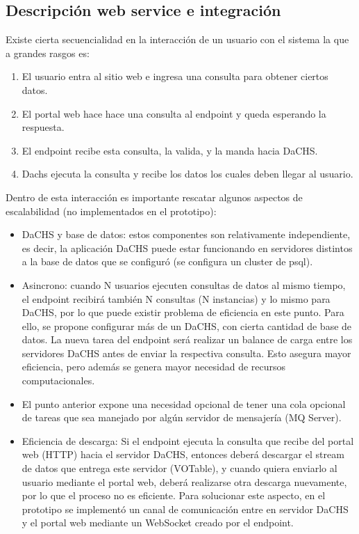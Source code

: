 \subsection{Descripción web service e integración}
Existe cierta secuencialidad en la interacción de un usuario con el sistema la que a grandes rasgos es:
\begin{enumerate}
	\item El usuario entra al sitio web e ingresa una consulta para obtener ciertos datos.
	\item El portal web hace hace una consulta al endpoint y queda esperando la respuesta.
	\item El endpoint recibe esta consulta, la valida, y la manda hacia DaCHS.
	\item Dachs ejecuta la consulta y recibe los datos los cuales deben llegar al usuario.
\end{enumerate}

Dentro de esta interacción es importante rescatar algunos aspectos de
escalabilidad (no implementados en el prototipo):
\begin{itemize}
	\item DaCHS y base de datos: estos componentes son relativamente
independiente, es decir, la aplicación DaCHS puede estar funcionando en
servidores distintos a la base de datos que se configuró (se configura un
cluster de psql).
	\item Asincrono: cuando N usuarios ejecuten consultas de datos al mismo
tiempo, el endpoint recibirá también N consultas (N instancias) y lo mismo para
DaCHS, por lo que puede existir problema de eficiencia en este punto. Para
ello, se propone configurar más de un DaCHS, con cierta cantidad de base de
datos. La nueva tarea del endpoint será realizar un balance de carga entre los
servidores DaCHS antes de enviar la respectiva consulta. Esto asegura mayor
eficiencia, pero además se genera mayor necesidad de recursos computacionales.
	\item El punto anterior expone una necesidad opcional de tener una cola
opcional de tareas que sea manejado por algún servidor de mensajería (MQ
Server).
	\item Eficiencia de descarga: Si el endpoint ejecuta la consulta que recibe
del portal web (HTTP) hacia el servidor DaCHS, entonces deberá descargar el
stream de datos que entrega este servidor (VOTable), y cuando quiera enviarlo
al usuario mediante el portal web, deberá realizarse otra descarga nuevamente,
por lo que el proceso no es eficiente. Para solucionar este aspecto, en el
prototipo se implementó un canal de comunicación entre en servidor DaCHS y el
portal web mediante un WebSocket creado por el endpoint. 
\end{itemize}

